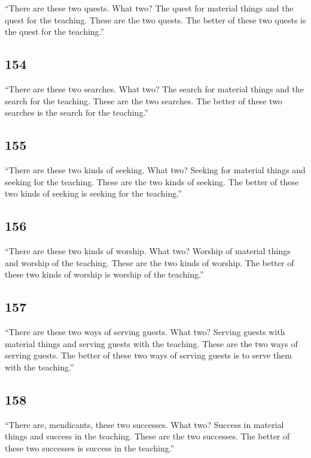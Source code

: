 \documentclass[12pt,openany]{book}%
\begin{document}
“There are these two quests. What two? The quest for material things and the quest for the teaching. These are the two quests. The better of these two quests is the quest for the teaching.” 

\subsection*{154 }

“There are these two searches. What two? The search for material things and the search for the teaching. These are the two searches. The better of these two searches is the search for the teaching.” 

\subsection*{155 }

“There are these two kinds of seeking. What two? Seeking for material things and seeking for the teaching. These are the two kinds of seeking. The better of these two kinds of seeking is seeking for the teaching.” 

\subsection*{156 }

“There are these two kinds of worship. What two? Worship of material things and worship of the teaching. These are the two kinds of worship. The better of these two kinds of worship is worship of the teaching.” 

\subsection*{157 }

“There are these two ways of serving guests. What two? Serving guests with material things and serving guests with the teaching. These are the two ways of serving guests. The better of these two ways of serving guests is to serve them with the teaching.” 

\subsection*{158 }

“There are, mendicants, these two successes. What two? Success in material things and success in the teaching. These are the two successes. The better of these two successes is success in the teaching.” 
\end{document}
